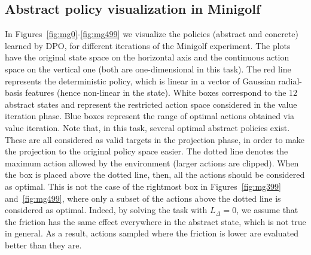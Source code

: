 \subsection{Abstract policy visualization in Minigolf}
In Figures~\ref{fig:mg0}-\ref{fig:mg499} we visualize the policies (abstract and concrete) learned by \ac{DPO}, for different iterations of the Minigolf experiment. The plots have the original state space on the horizontal axis and the continuous action space on the vertical one (both are one-dimensional in this task). The red line represents the deterministic policy, which is linear in a vector of Gaussian radial-basis features (hence non-linear in the state). White boxes correspond to the $12$ abstract states and represent the restricted action space considered in the value iteration phase. Blue boxes represent the range of optimal actions obtained via value iteration. Note that, in this task, several optimal abstract policies exist. These are all considered as valid targets in the projection phase, in order to make the projection to the original policy space easier. The dotted line denotes the maximum action allowed by the environment (larger actions are clipped). When the box is placed above the dotted line, then, all the actions should be considered as optimal. This is not the case of the rightmost box in Figures~\ref{fig:mg399} and~\ref{fig:mg499}, where only a subset of the actions above the dotted line is considered as optimal. Indeed, by solving the task with $L_{\Delta}=0$, we assume that the friction has the same effect everywhere in the abstract state, which is not true in general. As a result, actions sampled where the friction is lower are evaluated better than they are.

